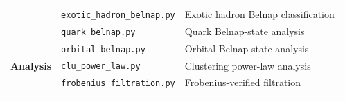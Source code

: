 \begin{longtable}[]{@{}lll@{}}
\begin{minipage}[t]{0.23\columnwidth}
\strut
\end{minipage} & \begin{minipage}[t]{0.26\columnwidth}\raggedright
\texttt{exotic\_hadron\_belnap.py}\strut
\end{minipage} & \begin{minipage}[t]{0.42\columnwidth}\raggedright
Exotic hadron Belnap classification\strut
\end{minipage}\tabularnewline
\begin{minipage}[t]{0.23\columnwidth}\raggedright
\strut
\end{minipage} & \begin{minipage}[t]{0.26\columnwidth}\raggedright
\texttt{quark\_belnap.py}\strut
\end{minipage} & \begin{minipage}[t]{0.42\columnwidth}\raggedright
Quark Belnap-state analysis\strut
\end{minipage}\tabularnewline
\begin{minipage}[t]{0.23\columnwidth}\raggedright
\strut
\end{minipage} & \begin{minipage}[t]{0.26\columnwidth}\raggedright
\texttt{orbital\_belnap.py}\strut
\end{minipage} & \begin{minipage}[t]{0.42\columnwidth}\raggedright
Orbital Belnap-state analysis\strut
\end{minipage}\tabularnewline
\begin{minipage}[t]{0.23\columnwidth}\raggedright
\textbf{Analysis}\strut
\end{minipage} & \begin{minipage}[t]{0.26\columnwidth}\raggedright
\texttt{clu\_power\_law.py}\strut
\end{minipage} & \begin{minipage}[t]{0.42\columnwidth}\raggedright
Clustering power-law analysis\strut
\end{minipage}\tabularnewline
\begin{minipage}[t]{0.23\columnwidth}\raggedright
\strut
\end{minipage} & \begin{minipage}[t]{0.26\columnwidth}\raggedright
\texttt{frobenius\_filtration.py}\strut
\end{minipage} & \begin{minipage}[t]{0.42\columnwidth}\raggedright
Frobenius-verified filtration\strut
\end{minipage}\tabularnewline
\begin{minipage}[t]{0.23\columnwidth}\raggedright

\end{minipage}
\end{longtable}
